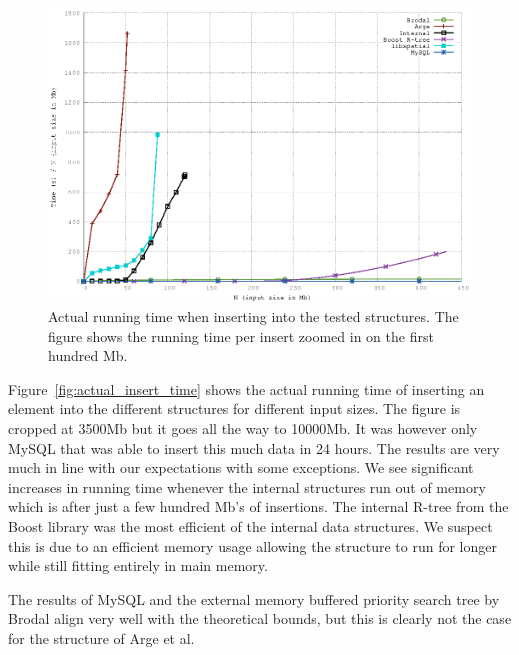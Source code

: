 \documentclass[twoside,11pt,openright]{report}
\begin{document}
\begin{figure}[htp!]
\includegraphics[width=\textwidth]{../src/experiments/insert_experiment_results/2016-05-06.14_11_08/time_zoom}
\caption{Actual running time when inserting into the tested structures. The figure shows the running time per insert zoomed in on the first hundred Mb.}
\label{fig:actual_insert_time_zoomed}
\end{figure}

Figure~\ref{fig:actual_insert_time} shows the actual running time of inserting an element into the different structures for different input sizes. 
The figure is cropped at 3500Mb but it goes all the way to 10000Mb. It was however only MySQL that was able to insert this much data in 24 hours.
The results are very much in line with our expectations with some exceptions. We see significant increases in running time whenever the internal structures run out of memory which is after just a few hundred Mb's of insertions. The internal R-tree from the Boost library was the most efficient of the internal data structures. We suspect this is due to an efficient memory usage allowing the structure to run for longer while still fitting entirely in main memory.

The results of MySQL and the external memory buffered priority search tree by Brodal align very well with the theoretical bounds, but this is clearly not the case for the structure of Arge et al. 
\end{document}
